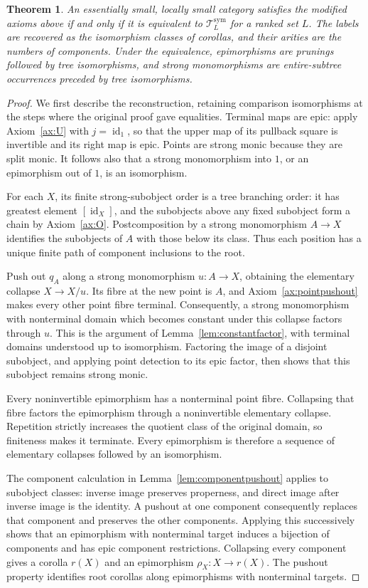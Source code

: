 \documentclass[11pt,a4paper]{article}
\theoremstyle{plain}
\newtheorem{theorem}{Theorem}[section]
\theoremstyle{definition}
\theoremstyle{remark}
\newcommand{\id}{\operatorname{id}}
\begin{document}
\begin{theorem}\label{concl:symmetric-representation}
An essentially small, locally small category satisfies the modified
axioms above if and only if it is equivalent to
$\mathcal T_L^{\mathrm{sym}}$ for a ranked set $L$. The labels are
recovered as the isomorphism classes of corollas, and their arities
are the numbers of components. Under the equivalence, epimorphisms
are prunings followed by tree isomorphisms, and strong monomorphisms
are entire-subtree occurrences preceded by tree isomorphisms.
\end{theorem}
\begin{proof}
We first describe the reconstruction, retaining comparison
isomorphisms at the steps where the original proof gave equalities.
Terminal maps are epic: apply Axiom~\ref{ax:U} with
$j=\id_1$, so that the upper map of its pullback square is
invertible and its right map is epic. Points are strong
monic because they are split monic. It follows also that a
strong monomorphism into $1$, or an epimorphism out of $1$,
is an isomorphism.

For each $X$, its finite strong-subobject order is a tree branching
order: it has greatest element $[\id_X]$, and the subobjects above
any fixed subobject form a chain by Axiom~\ref{ax:O}.
Postcomposition by a strong monomorphism $A\to X$ identifies
the subobjects of $A$ with those below its class. Thus each position
has a unique finite path of component inclusions to the root.

Push out $q_A$ along a strong monomorphism $u:A\to X$, obtaining
the elementary collapse $X\to X/u$. Its fibre at the new point is
$A$, and Axiom~\ref{ax:pointpushout} makes every other point fibre
terminal. Consequently, a strong monomorphism with nonterminal
domain which becomes constant under this collapse factors through
$u$. This is the argument of Lemma~\ref{lem:constantfactor}, with
terminal domains understood up to isomorphism. Factoring the image
of a disjoint subobject, and applying point detection to its epic
factor, then shows that this subobject remains strong monic.

Every noninvertible epimorphism has a nonterminal point fibre.
Collapsing that fibre factors the epimorphism through a
noninvertible elementary collapse. Repetition strictly increases
the quotient class of the original domain, so finiteness makes it
terminate. Every epimorphism is therefore a sequence of elementary
collapses followed by an isomorphism.

The component calculation in
Lemma~\ref{lem:componentpushout} applies to subobject classes:
inverse image preserves properness, and direct image after inverse
image is the identity. A pushout at one component consequently
replaces that component and preserves the other components. Applying
this successively shows that an epimorphism with nonterminal target
induces a bijection of components and has epic component
restrictions. Collapsing every component gives a corolla $r(X)$ and
an epimorphism $\rho_X:X\to r(X)$. The pushout property identifies
root corollas along epimorphisms with nonterminal targets.


\end{proof}
\end{document}
